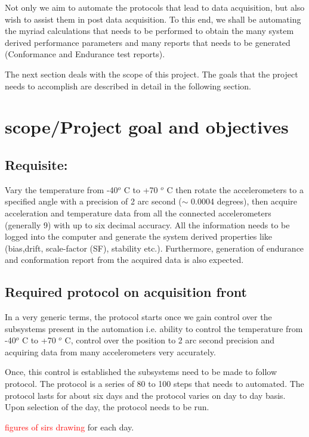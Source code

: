 \documentclass{FR16}
\begin{document}
Not only we aim to automate the protocols that lead to data acquisition, but also wish to assist them in post data acquisition. To this end, we shall be automating the myriad calculations that needs to be performed to obtain the many system derived performance parameters and many reports that needs to be generated (Conformance and Endurance test reports).

The next section deals with the scope of this project. The goals that the project needs to accomplish are described in detail in the following section.


\newpage
\section{scope/Project goal and objectives}
\subsection{Requisite:}
Vary the temperature from -40$^{o}$ C to +70 $^{o}$ C then rotate the accelerometers to a specified angle with a precision of 2 arc second ($\sim$ 0.0004 degrees), then acquire acceleration and temperature data from all the connected accelerometers (generally 9) with up to six decimal accuracy. All the information needs to be logged into the computer and generate the system derived properties like (bias,drift, scale-factor (SF),  stability etc.). Furthermore, generation of  endurance and conformation report from the acquired data is also expected.  

\subsection{Required protocol on acquisition front}
In a very generic terms, the protocol starts once we gain control over the subsystems present in the automation i.e. ability to control the temperature from -40$^{o}$ C to +70 $^{o}$ C, control over the position to 2 arc second precision and acquiring data from many accelerometers very accurately. 

Once, this control is established the subsystems need to be made to follow protocol. The protocol is a series of 80 to 100 steps that needs to automated. The protocol lasts for about six days and the protocol varies on day to day basis. Upon selection of the day, the protocol  needs to be run.

\textcolor{red}{figures of sirs drawing} for each day.
\end{document}
